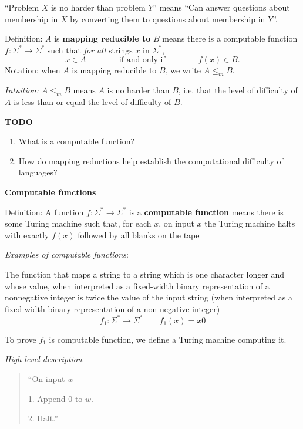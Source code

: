 \documentclass[12pt, oneside]{article}
\begin{document}
``Problem $X$ is no harder than problem $Y$'' means 
``Can answer questions about membership in $X$ by converting them to questions about membership in $Y$''.



Definition:  $A$ is  {\bf  mapping  reducible to} $B$  means there is a computable function 
$f : \Sigma^* \to \Sigma^*$ such that {\it for all} strings  $x$ in $\Sigma^*$, 
\[
x  \in  A \qquad \qquad \text{if and  only  if} \qquad \qquad f(x) \in B.
\]
Notation:  when $A$  is mapping reducible to $B$, we write $A  \leq_m B$.

{\it Intuition:} $A \leq_m B$ means $A$ is no harder than $B$, i.e. that the level 
of difficulty of $A$ is less than or equal the level of difficulty of $B$.

\vfill

{\bf TODO} 
\begin{enumerate}
\item What is a computable function?
\item How do mapping reductions help establish the computational difficulty of languages?
\end{enumerate}

\newpage
{\bf Computable functions}

Definition: A function $f: \Sigma^* \to \Sigma^*$ is a {\bf computable function} means there is some Turing machine such that, 
for each $x$, on input $x$ the Turing machine halts with exactly $f(x)$ followed by all blanks on the tape

\vspace{50pt}


{\it Examples of computable functions}:

The function that maps a string to a string which is one character longer and 
whose value, when interpreted as a fixed-width binary representation of a
nonnegative integer is twice the value of the input string (when interpreted as 
a fixed-width binary representation of a non-negative integer)
\[
f_1: \Sigma^* \to \Sigma^* \qquad  f_1(x)  = x0
\]

To prove $f_1$ is computable function, we define a Turing machine computing it.

{\it High-level description}
\begin{quote}
    ``On input $w$
    
    1. Append $0$ to $w$.
    
    2. Halt.''
\end{quote}
\end{document}
